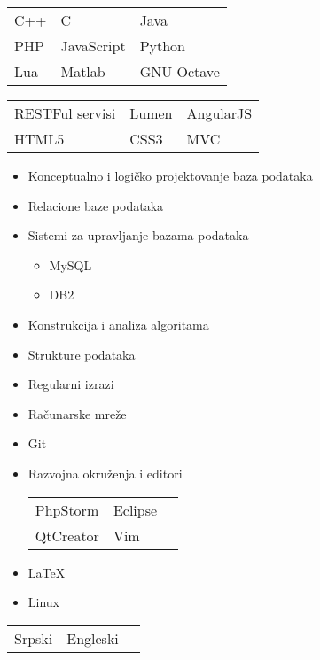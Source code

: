 \documentclass[a4paper,12pt]{memoir} %
\begin{document}
{
	\begin{tabular}{p{} p{} p{}}
	\bluebullet C++ &  \bluebullet C & \bluebullet Java\\
	\bluebullet PHP &  \bluebullet JavaScript& \bluebullet Python\\
	\bluebullet Lua & \bluebullet Matlab & \bluebullet GNU Octave\\
	\end{tabular}
}


{
	\begin{tabular}{p{} p{} p{}}
	\bluebullet RESTFul servisi &  \bluebullet Lumen & \bluebullet AngularJS\\
	\bluebullet HTML5 &  \bluebullet CSS3 & \bluebullet MVC\\
	\end{tabular}
}


{
	\begin{itemize}
		\item Konceptualno i logičko projektovanje baza podataka
		\item Relacione baze podataka
		\item Sistemi za upravljanje bazama podataka
		\begin{itemize}
			\item MySQL
			\item DB2
		\end{itemize}
	\end{itemize}	
}


{
	\begin{itemize}
		\item Konstrukcija i analiza algoritama
		\item Strukture podataka
		\item Regularni izrazi
		\item Računarske mreže
		\item Git
		\item Razvojna okruženja i editori\\
		\begin{tabular}{p{} p{} p{}}
			\bluebullet PhpStorm &  \bluebullet Eclipse\\
			\bluebullet QtCreator & \bluebullet Vim\\
		\end{tabular}
		\item LaTeX
		\item Linux
	\end{itemize}
}

\Sep %

	\begin{tabular}{p{} p{} p{}}
		\bluebullet Srpski &  \bluebullet Engleski\\
	\end{tabular}
\end{document}
